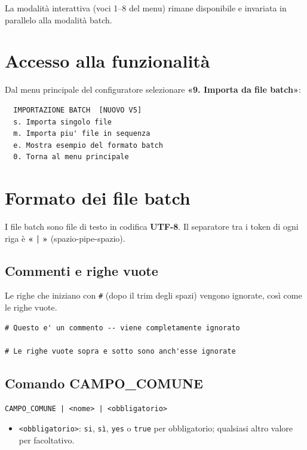 \documentclass[12pt,a4paper,oneside]{report}
\newcommand{\cmd}[1]{\texttt{\small#1}}
\newcommand{\menupunto}[1]{\textbf{«#1»}}
\begin{document}
La modalità interattiva (voci 1–8 del menu) rimane disponibile e invariata in parallelo alla modalità batch.

\section{Accesso alla funzionalità}

Dal menu principale del configuratore selezionare \menupunto{9. Importa da file batch}:

\begin{lstlisting}
  IMPORTAZIONE BATCH  [NUOVO V5]
  s. Importa singolo file
  m. Importa piu' file in sequenza
  e. Mostra esempio del formato batch
  0. Torna al menu principale
\end{lstlisting}

\section{Formato dei file batch}

I file batch sono file di testo in codifica \textbf{UTF-8}. Il separatore tra i token di ogni riga è \textbf{« | »} (spazio-pipe-spazio).

\subsection{Commenti e righe vuote}
Le righe che iniziano con \texttt{\#} (dopo il trim degli spazi) vengono ignorate, così come le righe vuote.
\begin{lstlisting}[style=batch]
# Questo e' un commento -- viene completamente ignorato

# Le righe vuote sopra e sotto sono anch'esse ignorate
\end{lstlisting}

\subsection{Comando CAMPO\_COMUNE}

\begin{lstlisting}[style=batch]
CAMPO_COMUNE | <nome> | <obbligatorio>
\end{lstlisting}

\begin{itemize}
  \item \texttt{<obbligatorio>}: \cmd{si}, \cmd{sì}, \cmd{yes} o \cmd{true} per obbligatorio; qualsiasi altro valore per facoltativo.
\end{itemize}
\end{document}
